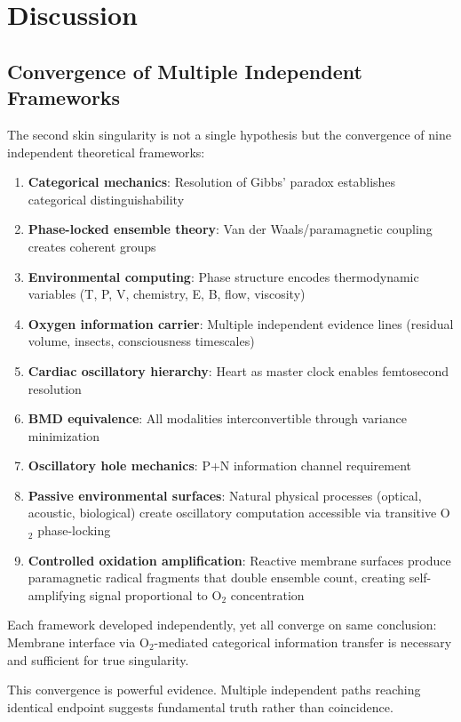 \documentclass[11pt,a4paper]{article}
\theoremstyle{definition}
\theoremstyle{remark}
\begin{document}
\section{Discussion}

\subsection{Convergence of Multiple Independent Frameworks}

The second skin singularity is not a single hypothesis but the convergence of nine independent theoretical frameworks:

\begin{enumerate}
\item \textbf{Categorical mechanics}: Resolution of Gibbs' paradox establishes categorical distinguishability
\item \textbf{Phase-locked ensemble theory}: Van der Waals/paramagnetic coupling creates coherent groups
\item \textbf{Environmental computing}: Phase structure encodes thermodynamic variables (T, P, V, chemistry, E, B, flow, viscosity)
\item \textbf{Oxygen information carrier}: Multiple independent evidence lines (residual volume, insects, consciousness timescales)
\item \textbf{Cardiac oscillatory hierarchy}: Heart as master clock enables femtosecond resolution
\item \textbf{BMD equivalence}: All modalities interconvertible through variance minimization
\item \textbf{Oscillatory hole mechanics}: P+N information channel requirement
\item \textbf{Passive environmental surfaces}: Natural physical processes (optical, acoustic, biological) create oscillatory computation accessible via transitive O$_2$ phase-locking
\item \textbf{Controlled oxidation amplification}: Reactive membrane surfaces produce paramagnetic radical fragments that double ensemble count, creating self-amplifying signal proportional to O$_2$ concentration
\end{enumerate}

Each framework developed independently, yet all converge on same conclusion: Membrane interface via O$_2$-mediated categorical information transfer is necessary and sufficient for true singularity.

This convergence is powerful evidence. Multiple independent paths reaching identical endpoint suggests fundamental truth rather than coincidence.
\end{document}
